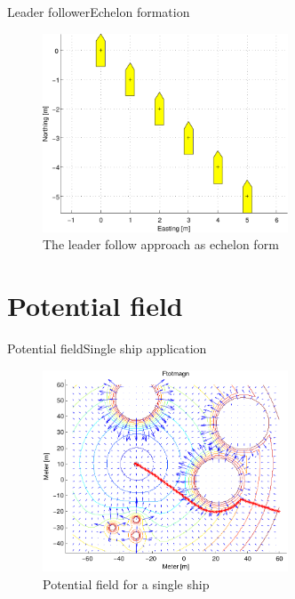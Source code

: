 \documentclass[10pt,handout]{beamer}
\begin{document}
\begin{frame}{Leader follower}{Echelon formation}
  \begin{figure}
    \includegraphics[width=0.65\textwidth]{img/echelon}
    \caption{The leader follow approach as echelon form}
    \label{fig:echelon}
  \end{figure}
\end{frame}

\section{Potential field}

\begin{frame}{Potential field}{Single ship application}
  \begin{figure}
    \includegraphics[width=0.65\textwidth]{img/ftotmagnfigpdf}
    \caption{Potential field for a single ship}
    \label{fig:potsingleship}
  \end{figure}
\end{frame}
\end{document}
